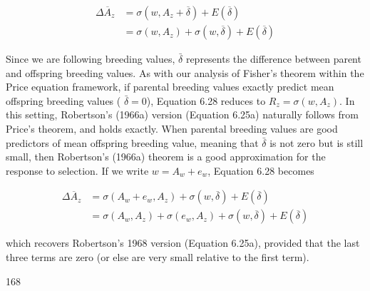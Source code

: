\documentclass{article}
\begin{document}
\begin{equation}
\begin{aligned}\Delta\overline{A}_{z}&=\sigma(w,A_{z}+\overline{\delta})+E(\overline{\delta})\\&=\sigma(w,A_{z})+\sigma(w,\overline{\delta})+E(\overline{\delta})\end{aligned}
\tag{6.28}
\label{eq:6_28}
\end{equation}

Since we are following breeding values,  $ \bar{\delta} $ represents the difference between parent and offspring breeding values. As with our analysis of Fisher's theorem within the Price equation framework, if parental breeding values exactly predict mean offspring breeding values ( $ \bar{\delta} = 0 $), Equation 6.28 reduces to  $ R_z = \sigma(w, A_z) $. In this setting, Robertson's (1966a) version (Equation 6.25a) naturally follows from Price's theorem, and holds exactly. When parental breeding values are good predictors of mean offspring breeding value, meaning that  $ \bar{\delta} $ is not zero but is still small, then Robertson's (1966a) theorem is a good approximation for the response to selection. If we write  $ w = A_w + e_w $, Equation 6.28 becomes

\begin{equation}
\begin{aligned}\Delta\overline{A}_{z}&=\sigma(A_{w}+e_{w},A_{z})+\sigma(w,\overline{\delta})+E(\overline{\delta})\\&=\sigma(A_{w},A_{z})+\sigma(e_{w},A_{z})+\sigma(w,\overline{\delta})+E(\overline{\delta})\end{aligned}
\tag{6.29}
\label{eq:6_29}
\end{equation}

which recovers Robertson’s 1968 version (Equation 6.25a), provided that the last three terms are zero (or else are very small relative to the first term).

168
\end{document}
